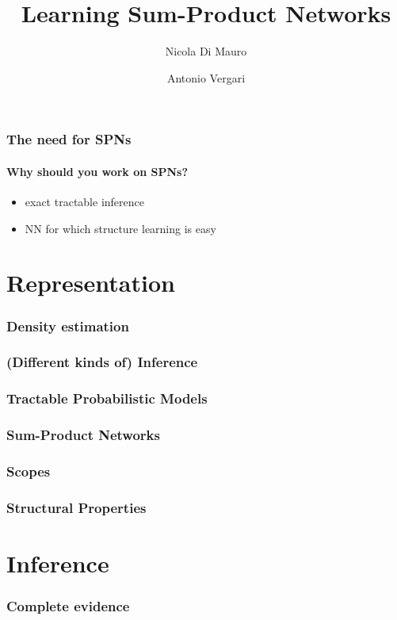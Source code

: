 \documentclass[xcolor={usenames,dvipsnames,svgnames}, compress]{beamer}
\title{Learning Sum-Product Networks}
\author{Nicola Di Mauro \and Antonio Vergari}
\institute{Università degli Studi di Bari}
\begin{document}
\begin{frame}
  \titlepage
\end{frame}


\begin{frame}[t]
  \frametitle{The need for SPNs}
  \framesubtitle{Why should you work on SPNs?}
\begin{itemize}
\item exact tractable inference
  \item NN for which structure learning is easy
\end{itemize}
\end{frame}

\section{Representation}
{
  \begin{frame}
    \sectionpage
  \end{frame}
}

\begin{frame}
  \frametitle{Density estimation}
\end{frame}

\begin{frame}
  \frametitle{(Different kinds of) Inference}
\end{frame}

\begin{frame}
  \frametitle{Tractable Probabilistic Models}
\end{frame}

\begin{frame}
  \frametitle{Sum-Product Networks}
\end{frame}

\begin{frame}
  \frametitle{Scopes}
\end{frame}

\begin{frame}
  \frametitle{Structural Properties}
\end{frame}

\section{Inference}
{
  \begin{frame}
    \sectionpage
  \end{frame}
}

\begin{frame}
  \frametitle{Complete evidence}
\end{frame}
\end{document}
